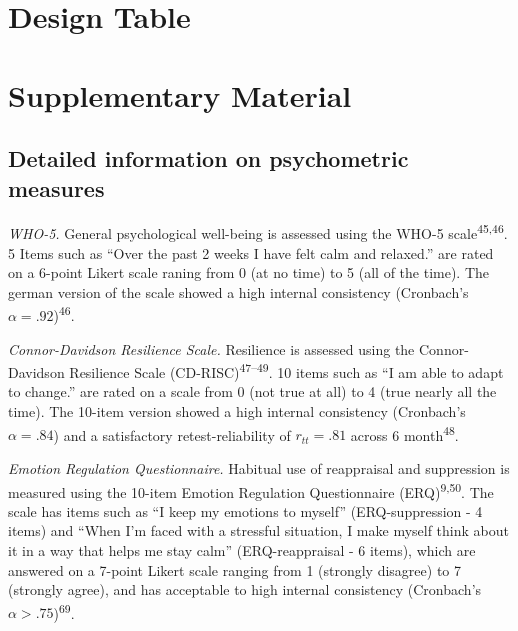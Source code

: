 \documentclass[
  man,floatsintext]{apa6}
\begin{document}
\hypertarget{DesignTable}{%
\section{Design Table}\label{DesignTable}}



\newpage

\hypertarget{SupplementaryMaterial}{%
\section{Supplementary Material}\label{SupplementaryMaterial}}


\setcounter{section}{19}
\setcounter{figure}{0}
\setcounter{table}{1}

\newpage

\hypertarget{SupplementQuestionnaires}{%
\subsection{Detailed information on psychometric measures}\label{SupplementQuestionnaires}}

\emph{WHO-5.} General psychological well-being is assessed using the WHO-5 scale\textsuperscript{45,46}.
5 Items such as ``Over the past 2 weeks I have felt calm and relaxed.'' are rated on a 6-point Likert scale raning from 0 (at no time) to 5 (all of the time).
The german version of the scale showed a high internal consistency (Cronbach's \(\alpha=.92\))\textsuperscript{46}.

\emph{Connor-Davidson Resilience Scale.} Resilience is assessed using the Connor-Davidson Resilience Scale (CD-RISC)\textsuperscript{47--49}.
10 items such as ``I am able to adapt to change.'' are rated on a scale from 0 (not true at all) to 4 (true nearly all the time).
The 10-item version showed a high internal consistency (Cronbach's \(\alpha=.84\)) and a satisfactory retest-reliability of \(r_{tt}=.81\) across 6 month\textsuperscript{48}.

\emph{Emotion Regulation Questionnaire.} Habitual use of reappraisal and suppression is measured using the 10-item Emotion Regulation Questionnaire (ERQ)\textsuperscript{9,50}.
The scale has items such as ``I keep my emotions to myself'' (ERQ-suppression - 4 items) and ``When I'm faced with a stressful situation, I make myself think about it in a way that helps me stay calm'' (ERQ-reappraisal - 6 items), which are answered on a 7-point Likert scale ranging from 1 (strongly disagree) to 7 (strongly agree), and has acceptable to high internal consistency (Cronbach's \(\alpha>.75\))\textsuperscript{69}.
\end{document}
